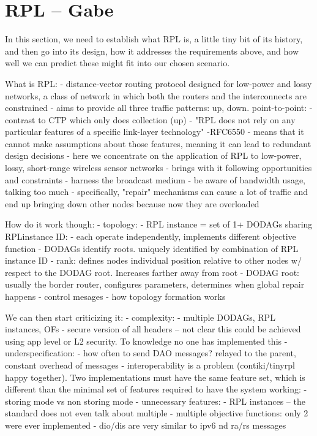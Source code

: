 \documentclass[conference]{IEEEtran}
\begin{document}
\section{RPL -- Gabe }

In this section, we need to establish what RPL is, a little tiny bit of its history, and then
go into its design, how it addresses the requirements above, and how well we can predict
these might fit into our chosen scenario.

What is RPL:
  - distance-vector routing protocol designed for low-power and lossy networks, a class of
    network in which both the routers and the interconnects are constrained
  - aims to provide all three traffic patterns: up, down. point-to-point:
    - contrast to CTP which only does collection (up)
  - "RPL does not rely on any particular features of a specific link-layer technology" -RFC6550
  - means that it cannot make assumptions about those features, meaning it can lead to
    redundant design decisions
  - here we concentrate on the application of RPL to low-power, lossy, short-range wireless
    sensor networks
  - brings with it following opportunities and constraints
    - harness the broadcast medium
    - be aware of bandwidth usage, talking too much
    - specifically, "repair" mechanisms can cause a lot of traffic and end up bringing down
      other nodes because now they are overloaded

How do it work though:
- topology:
  - RPL instance = set of 1+ DODAGs sharing RPLinstance ID:
    - each operate independently, implements different objective function
  - DODAGs identify roots. uniquely identified by combination of RPL instance ID
  - rank: defines nodes individual position relative to other nodes w/ respect to the
    DODAG root. Increases farther away from root
  - DODAG root: usually the border router, configures parameters, determines when global
    repair happens
- control mesages
- how topology formation works

We can then start criticizing it:
- complexity:
  - multiple DODAGs, RPL instances, OFs
  - secure version of all headers -- not clear this could be achieved using app level
    or L2 security. To knowledge no one has implemented this
- underspecification:
  - how often to send DAO messages? relayed to the parent, constant overhead of messages
  - interoperability is a problem (contiki/tinyrpl happy together). Two implementations
    must have the same feature set, which is different than the minimal set of features
    required to have the system working:
    - storing mode vs non storing mode
- unnecessary features:
  - RPL instances -- the standard does not even talk about multiple
  - multiple objective functions: only 2 were ever implemented
  - dio/dis are very similar to ipv6 nd ra/rs messages
\fi
\end{document}
